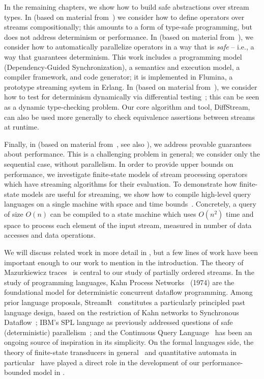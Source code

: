 In the remaining chapters, we show how to build safe abstractions over stream types.
In  (based on material from~) we consider how to define operators over streams compositionally; this amounts to a form of type-safe programming, but does not address determinism or performance.
In  (based on material from~), we consider how to automatically parallelize operators in a way that is \emph{safe} -- i.e., a way that guarantees determinism. This work includes a programming model (Dependency-Guided Synchronization), a semantics and execution model, a compiler framework, and code generator; it is implemented in Flumina, a prototype streaming system in Erlang.
In  (based on material from~), we
consider how to test for determinism dynamically via differential testing~\cite{mckeeman1998differential}; this can be seen as a dynamic
type-checking problem. Our core algorithm and tool, DiffStream, can also be used more generally to check equivalence assertions between streams at runtime.

Finally, in  (based on material from~, see also ), we address provable guarantees about performance. This is a challenging problem in general; we consider only the sequential case, without parallelism. In order to provide upper bounds on performance, we investigate finite-state models of stream processing operators which have streaming algorithms for their evaluation. To demonstrate how finite-state models are useful for streaming, we show how to compile high-level query languages on a single machine with space and time bounds~\cite{QRE,StreamQRE}. Concretely, a query of size $O(n)$ can be compiled to a state machine which uses $O(n^2)$ time and space to process each element of the input stream, measured in number of data accesses and data operations.

We will discuss related work in more detail in , but a few lines of work have been important enough to our work to mention in the introduction.
The theory of Mazurkiewicz traces~\cite{mazurkiewicz1986trace,DiekertR1995} is central to our study of partially ordered streams.
In the study of programming languages, Kahn Process Networks~\cite{gilles1974semantics} (1974) are the foundational model for deterministic concurrent dataflow programming.
Among prior language proposals, StreamIt~\cite{thies2002streamit} constitutes a particularly principled past language design, based on the restriction of Kahn networks to Synchronous Dataflow~\cite{lee1987synchronous};
IBM's SPL language as previously addressed questions of safe (deterministic) parallelism~\cite{HAG2013SPL,schneider2013safe,hirzel2014catalog};
and the Continuous Query Language~\cite{arasu2003cql,ABW2006CQL} has been an ongoing source of inspiration in its simplicity.
On the formal languages side,
the theory of finite-state transducers in general~\cite{EH2001MDST,AC2010SST}
and quantitative automata in particular~\cite{S1961WA,DKV2009HWA,AdADRY2013CRA}
have played a direct role in the development of our performance-bounded
model in .

